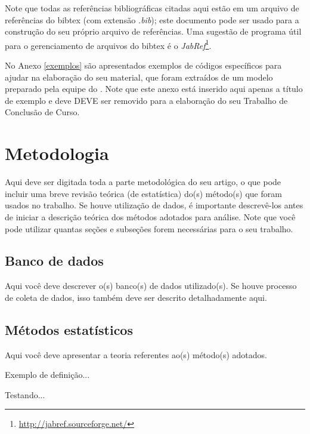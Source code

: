\documentclass[article,12pt,oneside,a4paper,chapter=TITLE,english,brazil]{abntex2}
\begin{document}
Note que todas as referências bibliográficas citadas aqui estão em um arquivo de referências do \textsf{bibtex} (com extensão \textit{.bib}); este documento pode ser usado para a construção do seu próprio arquivo de referências. Uma sugestão de programa útil para  o gerenciamento de arquivos do \textsf{bibtex} é o \textit{JabRef}\footnote{\url{http://jabref.sourceforge.net/}}.

No Anexo \ref{exemplos} são apresentados exemplos de códigos específicos para ajudar na elaboração do seu material, que foram extraídos de um modelo preparado pela equipe do \abnTeX. Note que este anexo está inserido aqui apenas a título de exemplo e deve DEVE ser removido para a elaboração do seu Trabalho de Conclusão de Curso.
\vspace{\onelineskip}


\chapter{Metodologia}

Aqui deve ser digitada toda a parte metodológica do seu artigo, o que pode incluir uma breve revisão teórica (de estatística) do(s) método(s) que foram usados no trabalho. Se houve utilização de dados, é importante descrevê-los antes de iniciar a descrição teórica dos métodos adotados para análise. Note que você pode utilizar quantas seções e subseções forem necessárias para o seu trabalho.


\section{Banco de dados}

Aqui você deve descrever o(s) banco(s) de dados utilizado(s). Se houve processo de coleta de dados, isso também deve ser descrito detalhadamente aqui.


\section{Métodos estatísticos}

Aqui você deve apresentar a teoria referentes ao(s) método(s) adotados.

Exemplo de definição...
\begin{definicao}
	Testando...
\end{definicao}
\end{document}
